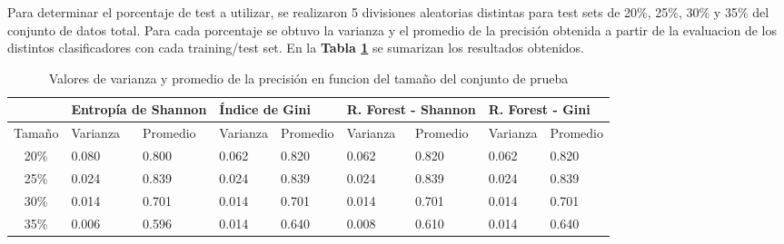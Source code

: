 \documentclass[a4paper]{article}
\newcommand{\reftable}[1]{\textbf{Tabla \ref{#1}}}
\begin{document}
Para determinar el porcentaje de test a utilizar, se realizaron 5 divisiones aleatorias distintas para test sets de 20\%, 25\%, 30\% y 35\% del conjunto de datos total. Para cada porcentaje se obtuvo la varianza y el promedio de la precisión obtenida a partir de la evaluacion de los distintos clasificadores con cada training/test set. En la \reftable{tab:testset-summary} se sumarizan los resultados obtenidos.

\begin{table}[h]
  \centering
  \begin{tabular}{@{}cllllllll@{}}
  \toprule
  \multicolumn{1}{l}{}       & \multicolumn{2}{l}{Entropía de Shannon} & \multicolumn{2}{l}{Índice de Gini} & \multicolumn{2}{l}{R. Forest - Shannon} & \multicolumn{2}{l}{R. Forest - Gini} \\ \midrule
  \multicolumn{1}{l}{Tamaño} & Varianza           & Promedio           & Varianza         & Promedio        & Varianza           & Promedio           & Varianza          & Promedio         \\
  20\%                       & 0.080              & 0.800              & 0.062            & 0.820           & 0.062              & 0.820              & 0.062             & 0.820            \\
  25\%                       & 0.024              & 0.839              & 0.024            & 0.839           & 0.024              & 0.839              & 0.024             & 0.839            \\
  30\%                       & 0.014              & 0.701              & 0.014            & 0.701           & 0.014              & 0.701              & 0.014             & 0.701            \\
  35\%                       & 0.006              & 0.596              & 0.014            & 0.640           & 0.008              & 0.610              & 0.014             & 0.640            \\ \bottomrule
  \end{tabular}
  \caption{Valores de varianza y promedio de la precisión en funcion del tamaño del conjunto de prueba}
  \label{tab:testset-summary}
  \end{table}
\end{document}
